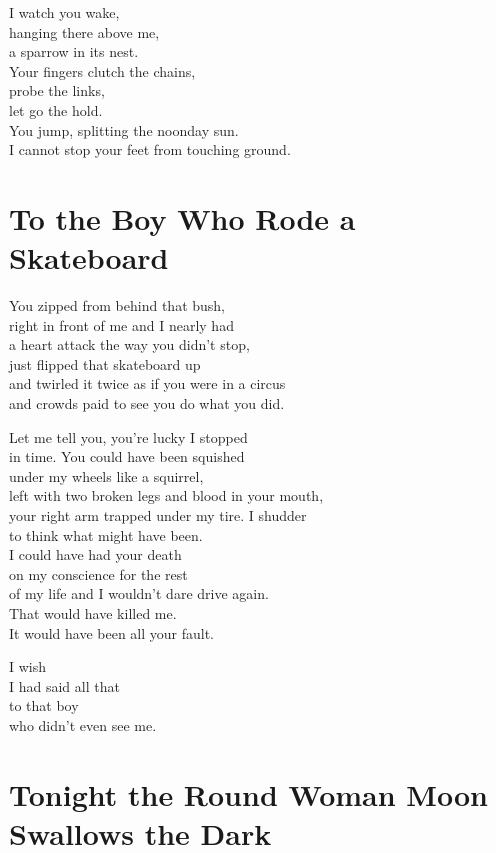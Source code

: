 \documentclass[twoside,10pt]{book}
\begin{document}
I watch you wake,\\
hanging there above me,\\
a sparrow in its nest.\\
Your fingers clutch the chains,\\
probe the links,\\
let go the hold.\\
You jump, splitting the noonday sun.\\
I cannot stop your feet from touching ground.


\clearpage
\section{To the Boy Who Rode a Skateboard}

You zipped from behind that bush,\\
right in front of me and I nearly had\\
a heart attack the way you didn't stop,\\
just flipped that skateboard up\\
and twirled it twice as if you were in a circus\\
and crowds paid to see you do what you did.

Let me tell you, you're lucky I stopped\\
in time. You could have been squished\\
under my wheels like a squirrel,\\
left with two broken legs and blood in your mouth,\\
your right arm trapped under my tire. I shudder\\
to think what might have been.\\
I could have had your death\\
on my conscience for the rest\\
of my life and I wouldn't dare drive again.\\
That would have killed me.\\
It would have been all your fault.

I wish\\
I had said all that\\
to that boy\\
who didn't even see me.


\clearpage
\section{Tonight the Round Woman Moon\\
  Swallows the Dark}
\end{document}
